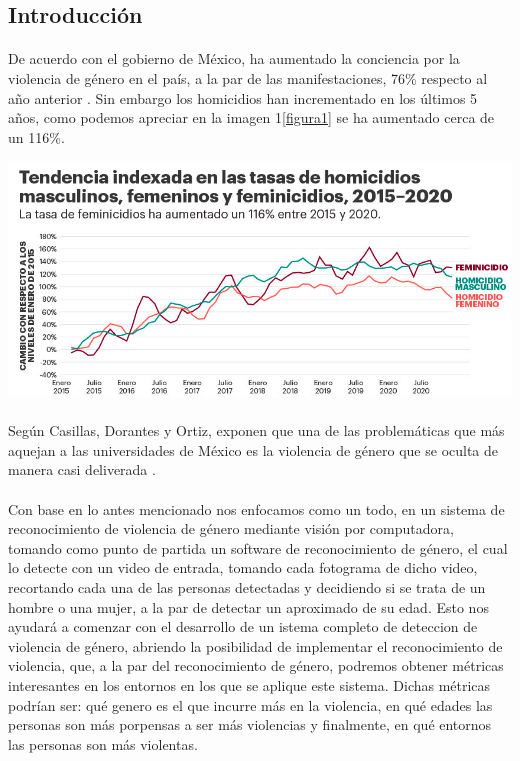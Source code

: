 \documentclass[9pt]{report}
\newenvironment{Figura}
  {\par\medskip\noindent\minipage{\linewidth}}
  {\endminipage\par\medskip}
\begin{document}
\begin{multicols}{2}
\begin{center}
	\section*{Introducción}
	\end{center}	
	\paragraph{}
	De acuerdo con el gobierno de México, ha aumentado la conciencia por la violencia de género en el país, a la par de las manifestaciones, 76\% respecto al año anterior \cite{Indice_de_paz}. Sin embargo los homicidios han incrementado en los últimos 5 años, como podemos apreciar en la imagen 1\ref{figura1} se ha aumentado cerca de un 116\%.
	\begin{Figura}
			\includegraphics[width=\textwidth]{TendenciasHomicidios2015-2020}
			\label{figura1}
		\end{Figura}
	\paragraph{}
	Según Casillas, Dorantes y Ortiz, exponen que una de las problemáticas que más aquejan a las universidades de México es la violencia de género que se oculta de manera casi deliverada \cite{CasillasDorantesyOrtiz}.	
	\paragraph{}
	Con base en lo antes mencionado nos enfocamos como un todo, en un sistema de reconocimiento de violencia de género mediante visión por computadora, tomando como punto de partida un software de reconocimiento de género, el cual lo detecte con un video de entrada, tomando cada fotograma de dicho video, recortando cada una de las personas detectadas y decidiendo si se trata de un hombre o una mujer, a la par de detectar un aproximado de su edad. Esto nos ayudará a comenzar con el desarrollo de un istema completo de deteccion de violencia de género, abriendo la posibilidad de implementar el reconocimiento de violencia, que, a la par del reconocimiento de género, podremos obtener métricas interesantes en los entornos en los que se aplique este sistema. Dichas métricas podrían ser: qué genero es el que incurre más en la violencia, en qué edades las personas son más porpensas a ser más violencias y finalmente, en qué entornos las personas son más violentas.
	

\end{multicols}
\end{document}
